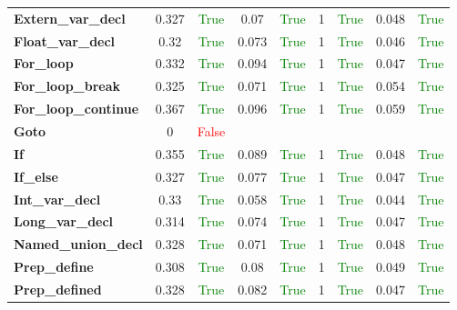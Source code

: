 \documentclass{article}
\begin{document}
\begin{xltabular}{\textwidth}{lcccccccc}
\textbf{{\fontsize{10}{12}\selectfont Extern\_var\_decl}}& 0.327&\textcolor{green}{True}& 0.07&\textcolor{green}{True}& 1&\textcolor{green}{True}& 0.048&\textcolor{green}{True} \\[0.5ex]
\textbf{{\fontsize{10}{12}\selectfont Float\_var\_decl}}& 0.32&\textcolor{green}{True}& 0.073&\textcolor{green}{True}& 1&\textcolor{green}{True}& 0.046&\textcolor{green}{True} \\[0.5ex]
\textbf{{\fontsize{10}{12}\selectfont For\_loop}}& 0.332&\textcolor{green}{True}& 0.094&\textcolor{green}{True}& 1&\textcolor{green}{True}& 0.047&\textcolor{green}{True} \\[0.5ex]
\textbf{{\fontsize{10}{12}\selectfont For\_loop\_break}}& 0.325&\textcolor{green}{True}& 0.071&\textcolor{green}{True}& 1&\textcolor{green}{True}& 0.054&\textcolor{green}{True} \\[0.5ex]
\textbf{{\fontsize{10}{12}\selectfont For\_loop\_continue}}& 0.367&\textcolor{green}{True}& 0.096&\textcolor{green}{True}& 1&\textcolor{green}{True}& 0.059&\textcolor{green}{True} \\[0.5ex]
\textbf{{\fontsize{10}{12}\selectfont Goto}}& 0&\textcolor{red}{False} \\[0.5ex]
\textbf{{\fontsize{10}{12}\selectfont If}}& 0.355&\textcolor{green}{True}& 0.089&\textcolor{green}{True}& 1&\textcolor{green}{True}& 0.048&\textcolor{green}{True} \\[0.5ex]
\textbf{{\fontsize{10}{12}\selectfont If\_else}}& 0.327&\textcolor{green}{True}& 0.077&\textcolor{green}{True}& 1&\textcolor{green}{True}& 0.047&\textcolor{green}{True} \\[0.5ex]
\textbf{{\fontsize{10}{12}\selectfont Int\_var\_decl}}& 0.33&\textcolor{green}{True}& 0.058&\textcolor{green}{True}& 1&\textcolor{green}{True}& 0.044&\textcolor{green}{True} \\[0.5ex]
\textbf{{\fontsize{10}{12}\selectfont Long\_var\_decl}}& 0.314&\textcolor{green}{True}& 0.074&\textcolor{green}{True}& 1&\textcolor{green}{True}& 0.047&\textcolor{green}{True} \\[0.5ex]
\textbf{{\fontsize{10}{12}\selectfont Named\_union\_decl}}& 0.328&\textcolor{green}{True}& 0.071&\textcolor{green}{True}& 1&\textcolor{green}{True}& 0.048&\textcolor{green}{True} \\[0.5ex]
\textbf{{\fontsize{10}{12}\selectfont Prep\_define}}& 0.308&\textcolor{green}{True}& 0.08&\textcolor{green}{True}& 1&\textcolor{green}{True}& 0.049&\textcolor{green}{True} \\[0.5ex]
\textbf{{\fontsize{10}{12}\selectfont Prep\_defined}}& 0.328&\textcolor{green}{True}& 0.082&\textcolor{green}{True}& 1&\textcolor{green}{True}& 0.047&\textcolor{green}{True} \\[0.5ex]

\end{xltabular}
\end{document}
